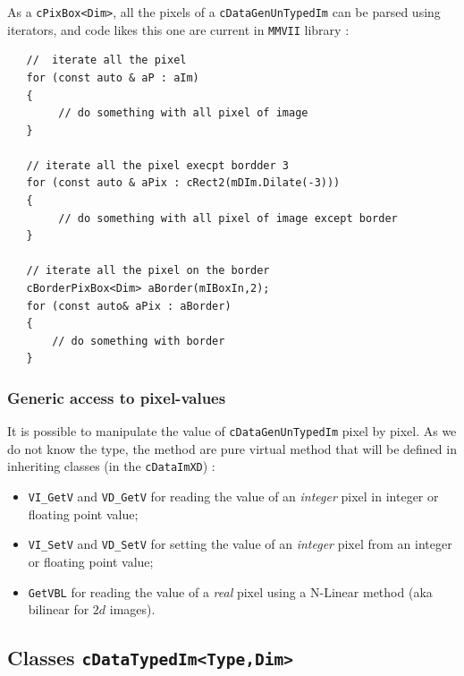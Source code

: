 As a  {\tt cPixBox<Dim>}, all the pixels of a {\tt cDataGenUnTypedIm} can be parsed
using iterators, and code likes this one are current in {\tt MMVII} library :

\lstset {language=C++}
\begin{lstlisting}
   //  iterate all the pixel
   for (const auto & aP : aIm)
   {
        // do something with all pixel of image
   }

   // iterate all the pixel execpt bordder 3
   for (const auto & aPix : cRect2(mDIm.Dilate(-3)))
   {
        // do something with all pixel of image except border
   }

   // iterate all the pixel on the border
   cBorderPixBox<Dim> aBorder(mIBoxIn,2);
   for (const auto& aPix : aBorder)
   {
       // do something with border
   }
\end{lstlisting}


\subsubsection{Generic access to pixel-values}

\label{GenPixVal}

It is possible to manipulate the value of {\tt cDataGenUnTypedIm}  pixel by pixel.  As
we do not know the type, the method are pure virtual method that will be defined in
inheriting classes  (in the {\tt cDataImXD}) :

\begin{itemize}
    \item  {\tt VI\_GetV} and {\tt VD\_GetV}  for reading the value of an \emph{integer} pixel
           in  integer or floating point value;

    \item  {\tt VI\_SetV} and {\tt VD\_SetV}  for setting the value of an \emph{integer} pixel
           from an   integer or floating point value;

    \item  {\tt GetVBL} for reading the value of  a \emph{real} pixel using a N-Linear method
           (aka bilinear for $2d$ images).
\end{itemize}


\subsection{Classes  {\tt cDataTypedIm<Type,Dim>}}

